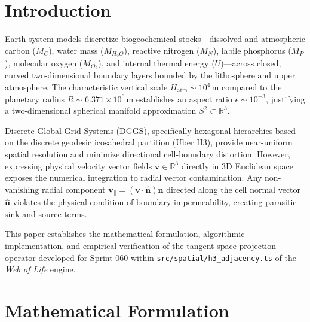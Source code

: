 \documentclass[10pt,journal,compsoc]{IEEEtran}
\begin{document}
\maketitle
\IEEEdisplaynontitleabstractindextext
\IEEEpeerreviewmaketitle

\section{Introduction}
 Earth-system models discretize biogeochemical stocks—dissolved and atmospheric carbon ($M_C$), water mass ($M_{H_2O}$), reactive nitrogen ($M_N$), labile phosphorus ($M_P$), molecular oxygen ($M_{O_2}$), and internal thermal energy ($U$)—across closed, curved two-dimensional boundary layers bounded by the lithosphere and upper atmosphere. The characteristic vertical scale $H_{\text{atm}} \sim 10^4\,\text{m}$ compared to the planetary radius $R \sim 6.371 \times 10^6\,\text{m}$ establishes an aspect ratio $\epsilon \sim 10^{-3}$, justifying a two-dimensional spherical manifold approximation $S^2 \subset \mathbb{R}^3$.

Discrete Global Grid Systems (DGGS), specifically hexagonal hierarchies based on the discrete geodesic icosahedral partition (Uber H3), provide near-uniform spatial resolution and minimize directional cell-boundary distortion. However, expressing physical velocity vector fields $\mathbf{v} \in \mathbb{R}^3$ directly in 3D Euclidean space exposes the numerical integration to radial vector contamination. Any non-vanishing radial component $\mathbf{v}_\parallel = (\mathbf{v} \cdot \hat{\mathbf{n}})\hat{\mathbf{n}}$ directed along the cell normal vector $\hat{\mathbf{n}}$ violates the physical condition of boundary impermeability, creating parasitic sink and source terms.

This paper establishes the mathematical formulation, algorithmic implementation, and empirical verification of the tangent space projection operator developed for Sprint 060 within \texttt{src/spatial/h3\_adjacency.ts} of the \textit{Web of Life} engine.

\section{Mathematical Formulation}
\end{document}

